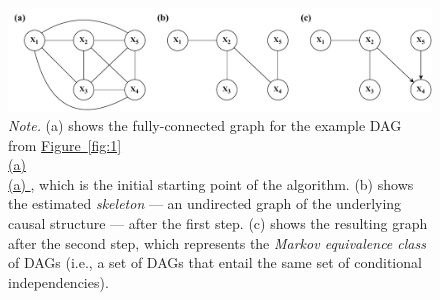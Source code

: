 \documentclass[twoside, 11pt]{article}
\newcommand*{\figref}[2][]{%
  \hyperref[{fig:#2}]{%
    Figure~\ref*{fig:#2}%
    \ifx\\#1\\%
    \else
      #1%
    \fi
  }%
}
\begin{document}
\begin{figure}[t]
    \centering
        \caption{Steps of a constraint-based method.}
        \includegraphics[width=1.0\textwidth]{figures/Fig2.pdf}
        \vspace{0.1mm}
        \caption*{\small{\textit{Note.} (a) shows the fully-connected graph for the example DAG from \figref[(a)]{1}, which is the initial starting point of the algorithm. (b) shows the estimated \textit{skeleton} --- an undirected graph of the underlying causal structure --- after the first step. (c) shows the resulting graph after the second step, which represents the \textit{Markov equivalence class} of DAGs (i.e., a set of DAGs that entail the same set of conditional independencies).}}
    \label{fig:2}
\end{figure}
\end{document}
